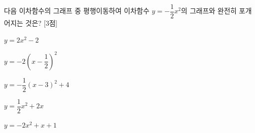 다음 이차함수의 그래프 중 평행이동하여 이차함수 $y=-\dfrac{1}{2}x^2$의 그래프와 완전히 포개어지는 것은? \mbox{[3점]}
\begin{choicesii}{\rule[-3ex]{0pt}{8ex}$y=2x^2-2$}{\rule[-3ex]{0pt}{8ex}$y=-2\left(x-\dfrac{1}{2}\right)^2$}{\rule[-3ex]{0pt}{8ex}$y=-\dfrac{1}{2}(x-3)^2+4$}{\rule[-3ex]{0pt}{8ex}$y=\dfrac{1}{2}x^2+2x$}{\rule[-3ex]{0pt}{8ex}$y=-2x^2+x+1$}\end{choicesii}
